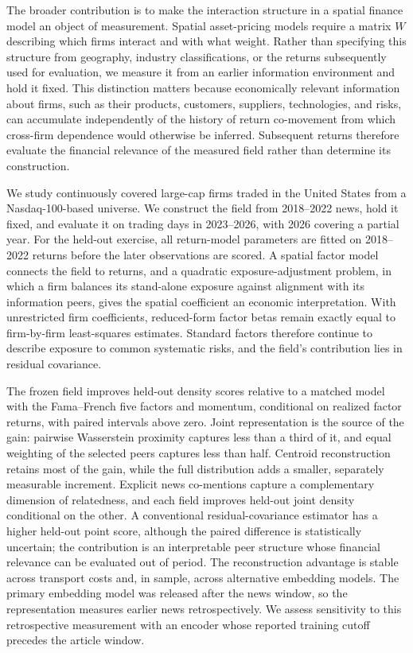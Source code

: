 The broader contribution is to make the interaction structure in a spatial
finance model an object of measurement.
Spatial asset-pricing models require a matrix $W$ describing which firms
interact and with what weight.
Rather than specifying this structure from geography, industry
classifications, or the returns subsequently used for evaluation, we measure it
from an earlier information environment and hold it fixed.
This distinction matters because economically relevant information about firms,
such as their products, customers, suppliers, technologies, and risks, can
accumulate independently of the history of return co-movement from which
cross-firm dependence would otherwise be inferred.
Subsequent returns therefore evaluate the financial relevance of the measured
field rather than determine its construction.

We study  continuously covered large-cap firms
traded in the United States from a Nasdaq-100-based universe.
We construct the field from 2018--2022 news, hold it fixed, and evaluate it on
 trading days in 2023--2026, with
2026 covering a partial year.
For the held-out exercise, all return-model parameters are fitted on
2018--2022 returns before the later observations are scored.
A spatial factor model connects the field to returns, and a quadratic
exposure-adjustment problem, in which a firm balances its stand-alone exposure
against alignment with its information peers, gives the spatial coefficient an
economic interpretation.
With unrestricted firm coefficients, reduced-form factor betas remain exactly
equal to firm-by-firm least-squares estimates.
Standard factors therefore continue to describe exposure to common systematic
risks, and the field's contribution lies in residual covariance.

The frozen field improves held-out density scores relative to a matched model
with the Fama--French five factors and momentum, conditional on realized factor
returns, with paired intervals above zero.
Joint representation is the source of the gain: pairwise Wasserstein
proximity captures less than a third of it, and equal weighting of the selected
peers captures less than half.
Centroid reconstruction retains most of the gain, while the full distribution
adds a smaller, separately measurable increment.
Explicit news co-mentions capture a complementary dimension of relatedness, and
each field improves held-out joint density conditional on the other.
A conventional residual-covariance estimator has a higher held-out point
score, although the paired difference is statistically uncertain; the
contribution is an interpretable peer structure whose financial relevance can
be evaluated out of period.
The reconstruction advantage is stable across transport costs and, in sample,
across alternative embedding models.
The primary embedding model was released after the news window, so the
representation measures earlier news retrospectively.
We assess sensitivity to this retrospective measurement with an encoder
whose reported training cutoff precedes the article window.


